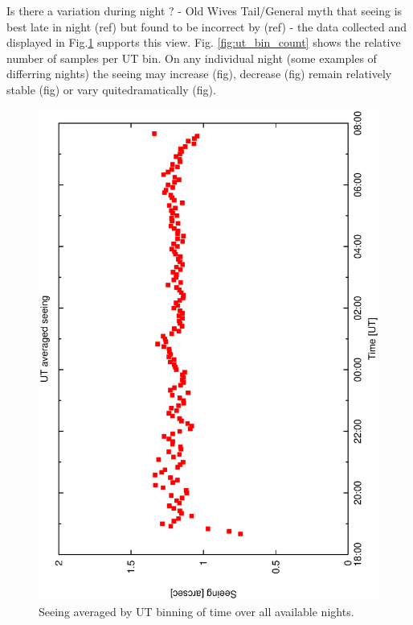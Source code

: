 {{Is there a variation during night ? - Old Wives Tail/General myth that seeing is best late in night (ref) but found to be incorrect by (ref) - the data collected and displayed in Fig.\ref{fig:ut_av_seeing} supports this view. Fig. \ref{fig:ut_bin_count} shows the relative number of samples per UT bin. On any individual night (some examples of differring nights) the seeing may increase (fig), decrease (fig) remain relatively stable (fig) or vary quitedramatically (fig).

\begin{figure}[htbp]
\begin{center}
    \includegraphics[scale=0.4, angle=-90]{figures/ecs/corr_see_ut.eps}
\end{center} 
\caption[Seeing averaged by UT binning of time over all available nights.]
{Seeing averaged by UT binning of time over all available nights.}
\label{fig:ut_av_seeing}
\end{figure}

}}
